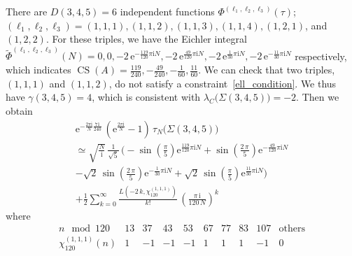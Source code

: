 \documentclass[12pt,reqno]{amsart}
\numberwithin{equation}{section}
\DeclareMathOperator{\CS}{CS}
\begin{document}
\begin{itemize}
  There are  $D(3,4,5)=6$ independent functions 
  $  \Phi^{(\ell_1, \ell_2, \ell_3)}(\tau)$;
  $(\ell_1, \ell_2, \ell_3)
  =
  (1,1,1),
  (1,1,2),
  (1,1,3),
  (1,1,4),
  (1,2,1)$,
  and $
  (1,2,2)
  $.
  For these triples, we have the Eichler integral
  $
  \widetilde{\Phi}^{(\ell_1, \ell_2, \ell_3)}(N)
  =
  0,
  0,
  -2 \, \mathrm{e}^{-\frac{119}{120} \pi \mathrm{i} N},
  -2 \, \mathrm{e}^{\frac{49}{120} \pi \mathrm{i} N},
  -2 \, \mathrm{e}^{\frac{1}{30} \pi \mathrm{i} N},
  -2 \, \mathrm{e}^{-\frac{11}{30} \pi \mathrm{i} N}
  $ respectively,
  which indicates
  $\CS(A)
  = \frac{119}{240},
  -\frac{49}{240},
  -\frac{1}{60},
  \frac{11}{60}
 $.
  We can check that
  two triples,  $(1,1,1)$ and $(1,1,2)$,  do not satisfy
  a constraint~\eqref{ell_condition}.
  We thus have $\gamma(3,4,5)=4$, which is consistent with
  $\lambda_C\bigl(\Sigma(3,4,5)\bigr)=-2$.
  Then we obtain
  \begin{multline*}
    \mathrm{e}^{
      - \frac{2 \pi \mathrm{i}}{N}
      \frac{71}{240} 
    } \,
    \left(
      \mathrm{e}^{\frac{2 \pi \mathrm{i}}{N}} - 1
    \right)
    \,    \tau_N \bigl( \Sigma(3,4,5) \bigr)
    \\
    \simeq
    \sqrt{\frac{N}{ \mathrm{i} }} \,
    \frac{1}{\sqrt{5}} \,
    \Biggl(
      - \sin \left(     \frac{ \pi }{5}  \right)
      \mathrm{e}^{ \frac{119}{120} \pi \mathrm{i}  N}
      +
      \sin \left(     \frac{2 \, \pi }{5}  \right)
      \mathrm{e}^{- \frac{49}{120} \pi \mathrm{i}  N}
      \\
      -
      \sqrt{2} \,
      \sin \left(     \frac{2\, \pi }{5} \right)
      \mathrm{e}^{ -\frac{1}{30} \pi \mathrm{i}  N}
      +
      \sqrt{2} \,
      \sin \left(     \frac{ \pi }{5}  \right)
      \mathrm{e}^{ \frac{11}{30} \pi \mathrm{i}  N}
    \Biggr)
    \\
    + \frac{1}{2} \sum_{k=0}^\infty
    \frac{L(-2 \, k , \chi_{120}^{(1,1,1)})}{k!}
    \,
    \left(
      \frac{\pi \, \mathrm{i}}{
        120 \, N
      }
    \right)^k
  \end{multline*}
  where
  \begin{equation*}
    \begin{array}{c||ccccccccc}
      n \mod 120 &
      13 & 37 & 43 & 53 & 67 & 77 & 83 & 107 &
      \text{others}
      \\
      \hline
      \chi_{120}^{(1,1,1)}(n)
      & 1 & -1 &-1 & -1 & 1 & 1 & 1 & -1 & 0
    \end{array}
  \end{equation*}
\end{itemize}
\end{document}
